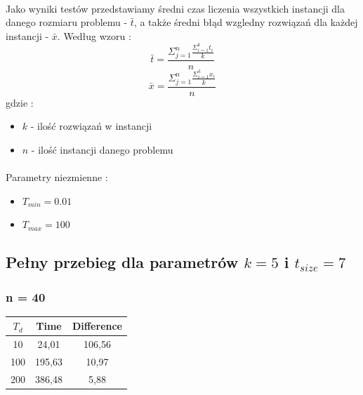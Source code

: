 \documentclass[wide,a4paper,titlepage,12pt] {article}
\begin{document}
\paragraph{}
Jako wyniki testów przedstawiamy średni czas liczenia wszystkich instancji dla danego rozmiaru problemu - $\bar{t}$, a także średni błąd wzgledny  rozwiązań dla każdej instancji - $\bar{x}$. Według wzoru : \\
\begin{equation}
    \bar{t} = \frac{\Sigma_{j=1}^{n}\frac{\Sigma_{i=1}^{k}t_{i}}{k}}{n}
\end{equation}
\begin{equation}
    \bar{x} = \frac{\Sigma_{j=1}^{n}\frac{\Sigma_{i=1}^{k}x_{i}}{k}}{n}
\end{equation}
gdzie : \\
\begin{itemize}
  \item $k$ - ilość rozwiązań w instancji
  \item $n$ - ilość instancji danego problemu
\end{itemize}
\paragraph{}
Parametry niezmienne :
\begin{itemize}
  \item $T_{min} = 0.01$
  \item $T_{max} = 100$
\end{itemize}
\newpage
\subsection{Pełny przebieg dla parametrów $k=5$ i $t_{size} = 7$}
\subsubsection{n = 40}
\begin{center}
    \begin{tabular}{|c|c|c|}
      \hline
       $T_{d}$ & Time & Difference \\ \hline
        10  &24,01&   106,56\\ \hline
        100 &195,63 & 10,97\\ \hline
        200 &386,48 & 5,88\\ \hline
    \end{tabular}
\end{center}
\end{document}
